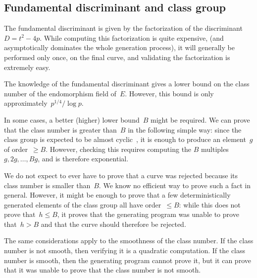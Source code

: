 \documentclass[twocolumn,letterpaper]{article}
\begin{document}
\subsection{Fundamental discriminant and class group}

The fundamental discriminant is given by
the factorization of the discriminant~$D = t^2 - 4 p$.
While computing this factorization is quite expensive,
(and asymptotically dominates the whole generation process),
it will generally be performed only once, on the final curve,
and validating the factorization is extremely easy.

The knowledge of the fundamental discriminant gives a lower bound
on the class number of the endomorphism field of~$E$.
However, this bound is only approximately~$p^{1/4}/\log p$.

\smallskip

In some cases, a better (higher) lower bound~$B$ might be required.
We can prove that the class number is greater than~$B$
in the following simple way:
since the class group is expected to be almost cyclic~\cite{nt1984cl},
it is enough to produce an element~$g$ of order~$≥ B$.
However, checking this requires
computing the $B$ multiples~$g, 2g, …, B g$,
and is therefore exponential.

We do not expect to ever have to prove that a curve was rejected
because its class number is smaller than~$B$.
We know no efficient way to prove such a fact in general.
However, it might be enough to prove
that a few deterministically generated elements of the class group
all have order~$≤ B$:
while this does not prove that~$h ≤ B$,
it proves that the generating program was unable to prove that~$h > B$
and that the curve should therefore be rejected.

\smallskip

The same considerations apply to the smoothness of the class number.
If the class number is not smooth, then
verifying it is a quadratic computation.
If the class number is smooth, then
the generating program cannot prove it,
but it can prove that it was unable to prove that
the class number is not smooth.



\end{document}
